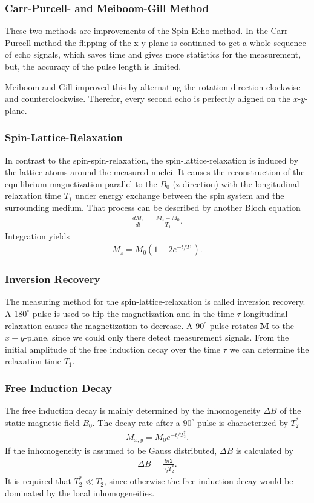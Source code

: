 \documentclass[a4paper,10pt]{article}
\begin{document}
\subsubsection*{Carr-Purcell- and Meiboom-Gill Method}
These two methods are improvements of the Spin-Echo method. In the Carr-Purcell method the flipping of the x-y-plane is continued to get a whole sequence of echo signals, which saves time and gives more statistics for the measurement, but, the accuracy of the pulse length is limited. 

Meiboom and Gill improved this by alternating the rotation direction clockwise and counterclockwise. Therefor, every second echo is perfectly aligned on the $x$-$y$-plane.

\subsubsection{Spin-Lattice-Relaxation}
In contrast to the spin-spin-relaxation,  the spin-lattice-relaxation is induced by the lattice atoms around the measured nuclei.
It causes the reconstruction of the equilibrium magnetization parallel to the $B_0$ (z-direction) with the longitudinal relaxation time $T_1$ under energy exchange between the spin system and the surrounding medium. 
That process can be described by another Bloch equation
\begin{eqnarray}
 \frac{dM_z}{dt} = \frac{M_z-M_0}{T_1}.
\end{eqnarray}
Integration yields
\begin{eqnarray}
 M_z=M_0 \left(1-2 e^{-t/T_1} \right).
\end{eqnarray}

\subsubsection*{Inversion Recovery}
The measuring method for the spin-lattice-relaxation is called inversion recovery. A $180^\circ$-pulse is used to flip the magnetization and in the time $\tau$ longitudinal relaxation causes the magnetization to decrease. A $90^\circ$-pulse rotates $\mathbf{M}$ to the $x-y$-plane, since we could only there detect measurement signals. From the initial amplitude of the free induction decay over the time $\tau$ we can determine the relaxation time $T_1$.

\subsubsection{Free Induction Decay}
The free induction decay is mainly determined by the inhomogeneity $\Delta B$ of the static magnetic field $B_0$.  The decay rate after a $90^\circ$ pulse is characterized by $T_2^*$
\begin{eqnarray}
 M_{x,y} = M_0 e^{-t/T_2^*}.
\end{eqnarray}
If the inhomogeneity is assumed to be Gauss distributed, $\Delta B$ is calculated by
\begin{eqnarray}
 \Delta B = \frac{ln2}{\gamma_I T_2^*}.
\end{eqnarray}
 It is required that $T_2^* \ll T_2$, since otherwise the free induction decay would be dominated by the local inhomogeneities.
\end{document}
